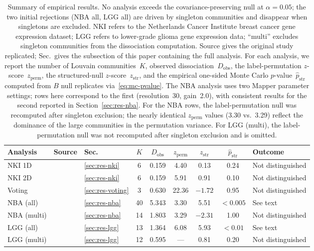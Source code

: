 \documentclass[hidelinks]{siamart251216}
\begin{document}
\begin{table}[t]
\centering
\footnotesize
\caption{Summary of empirical results.  No analysis exceeds the
covariance-preserving null at $\alpha = 0.05$; the two initial
rejections (NBA all, LGG all) are driven by singleton communities and
disappear when singletons are excluded.
NKI refers to the Netherlands Cancer Institute breast cancer gene
expression dataset; LGG refers to lower-grade glioma gene expression
data; ``multi'' excludes singleton communities from the dissociation
computation.  Source gives the original study replicated; Sec.\ gives
the subsection of this paper containing the full analysis.
For each analysis, we report the number of Louvain communities~$K$,
observed dissociation~$D_{\mathrm{obs}}$, the label-permutation
$z$-score~$z_{\mathrm{perm}}$, the structured-null
$z$-score~$z_{\mathrm{str}}$, and the empirical one-sided Monte Carlo
$p$-value~$\hat{p}_{\mathrm{str}}$ computed from $B$ null replicates
via~\eqref{eq:mc-pvalue}.  The NBA analysis uses two Mapper parameter settings; rows here
correspond to the first (resolution~30, gain~2.0), with consistent
results for the second reported in Section~\ref{sec:res-nba}.
For the NBA rows, the label-permutation null was recomputed after
singleton exclusion; the nearly identical $z_{\mathrm{perm}}$ values
(3.30 vs.\ 3.29) reflect the dominance of the large communities in
the permutation variance.  For LGG (multi), the label-permutation null
was not recomputed after singleton exclusion and is omitted.}
\label{tab:results}
\setlength{\tabcolsep}{3.5pt}
\begin{tabular}{@{}lllcccccl@{}}
\toprule
\textbf{Analysis} & \textbf{Source} & \textbf{Sec.} & $K$ & $D_{\mathrm{obs}}$ & $z_{\mathrm{perm}}$ & $z_{\mathrm{str}}$ & $\hat{p}_{\mathrm{str}}$ & \textbf{Outcome} \\
\midrule
NKI 1D   & \cite{Lum2013}   & \ref{sec:res-nki}  &  6 & 0.159 & 4.40  &  0.13    & 0.24 & Not distinguished \\
NKI 2D   & \cite{Lum2013}   & \ref{sec:res-nki}  &  6 & 0.159 & 5.91  &  0.91    & 0.10 & Not distinguished \\
Voting   & \cite{Lum2013}   & \ref{sec:res-voting} &  3 & 0.630 & 22.36 & $-1.72$  & 0.95 & Not distinguished \\
NBA (all) & \cite{Lum2013}  & \ref{sec:res-nba}  & 40 & 5.343 & 3.30  &  5.51    & $<0.005$ & See text \\
NBA (multi) & \cite{Lum2013} & \ref{sec:res-nba}  & 14 & 1.803 & 3.29  & $-2.31$ & 1.00 & Not distinguished \\
LGG (all) & \cite{RabadanCamara2020} & \ref{sec:res-lgg} & 13 & 1.364 & 6.08  &  5.93    & $<0.01$ & See text \\
LGG (multi) & \cite{RabadanCamara2020} & \ref{sec:res-lgg} & 12 & 0.595 & ---   &  0.81    & 0.20 & Not distinguished \\
\bottomrule
\end{tabular}
\end{table}
\end{document}
